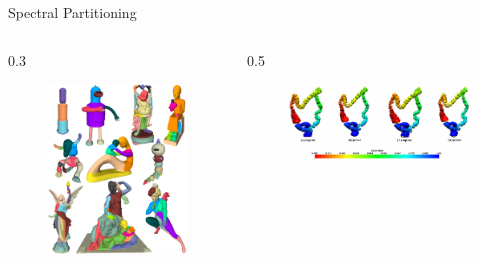 \documentclass{beamer}
\begin{document}
\begin{frame}{Spectral Partitioning}
    \begin{columns}
        \begin{column}{0.3\pagewidth}
            \begin{figure}
                \centering
                \includegraphics[width=\textwidth]{../figures/spectral_partitioning.png}
            \end{figure}
        \end{column}
        \begin{column}{0.5\pagewidth}
            \begin{figure}
                \centering
                \includegraphics[width=\textwidth]{../figures/fielder_vector_colon.png}
            \end{figure}
        \end{column}
    \end{columns}
\end{frame}
    
\end{document}
